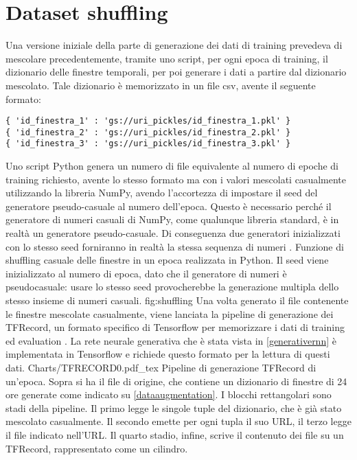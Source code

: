 \section{Dataset shuffling}
Una versione iniziale della parte di generazione dei dati di training prevedeva di mescolare precedentemente, tramite uno script, per ogni epoca di training, il dizionario delle finestre temporali, per poi generare i dati a partire dal dizionario mescolato. Tale dizionario è memorizzato in un file csv, avente il seguente formato:
\begin{lstlisting}
{ 'id_finestra_1' : 'gs://uri_pickles/id_finestra_1.pkl' }
{ 'id_finestra_2' : 'gs://uri_pickles/id_finestra_2.pkl' }
{ 'id_finestra_3' : 'gs://uri_pickles/id_finestra_3.pkl' }
\end{lstlisting}
Uno script Python genera un numero di file equivalente al numero di epoche di training richiesto, avente lo stesso formato ma con i valori mescolati casualmente utilizzando la libreria NumPy, avendo l’accortezza di impostare il seed del generatore pseudo-casuale al numero dell’epoca. Questo è necessario perché il generatore di numeri casuali di NumPy, come qualunque libreria standard, è in realtà un generatore pseudo-casuale. Di conseguenza due generatori inizializzati con lo stesso seed forniranno in realtà la stessa sequenza di numeri \cite{numpyrandomstate}.
{Funzione di shuffling casuale delle finestre in un epoca realizzata in Python. Il seed viene inizializzato al numero di epoca, dato che il generatore di numeri è pseudocasuale: usare lo stesso seed provocherebbe la generazione multipla dello stesso insieme di numeri casuali. }
{fig:shuffling}
Una volta generato il file contenente le finestre mescolate casualmente, viene lanciata la pipeline di generazione dei TFRecord, un formato specifico di Tensorflow per memorizzare i dati di training ed evaluation \cite{tensorflow}. La rete neurale generativa che è stata vista in \ref{generativernn} è implementata in Tensorflow e richiede questo formato per la lettura di questi dati.
\svg
{Charts/TFRECORD0.pdf_tex}
{Pipeline di generazione TFRecord di un'epoca. Sopra si ha il file di origine, che contiene un dizionario di finestre di 24 ore generate come indicato su \ref{dataaugmentation}. I blocchi rettangolari sono stadi della pipeline. Il primo legge le singole tuple del dizionario, che è già stato mescolato casualmente. Il secondo emette per ogni tupla il suo URL, il terzo legge il file indicato nell'URL. Il quarto stadio, infine, scrive il contenuto dei file su un TFRecord, rappresentato come un cilindro. }
